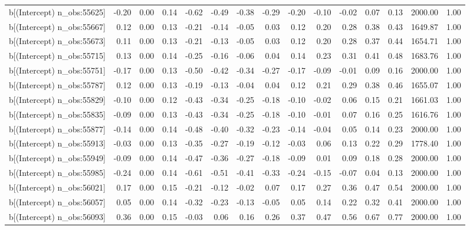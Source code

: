\begin{table}[ht]
\begin{tabular}{rrrrrrrrrrrrrrr}
  b[(Intercept) n\_obs:55625] & -0.20 & 0.00 & 0.14 & -0.62 & -0.49 & -0.38 & -0.29 & -0.20 & -0.10 & -0.02 & 0.07 & 0.13 & 2000.00 & 1.00 \\ 
  b[(Intercept) n\_obs:55667] & 0.12 & 0.00 & 0.13 & -0.21 & -0.14 & -0.05 & 0.03 & 0.12 & 0.20 & 0.28 & 0.38 & 0.43 & 1649.87 & 1.00 \\ 
  b[(Intercept) n\_obs:55673] & 0.11 & 0.00 & 0.13 & -0.21 & -0.13 & -0.05 & 0.03 & 0.12 & 0.20 & 0.28 & 0.37 & 0.44 & 1654.71 & 1.00 \\ 
  b[(Intercept) n\_obs:55715] & 0.13 & 0.00 & 0.14 & -0.25 & -0.16 & -0.06 & 0.04 & 0.14 & 0.23 & 0.31 & 0.41 & 0.48 & 1683.76 & 1.00 \\ 
  b[(Intercept) n\_obs:55751] & -0.17 & 0.00 & 0.13 & -0.50 & -0.42 & -0.34 & -0.27 & -0.17 & -0.09 & -0.01 & 0.09 & 0.16 & 2000.00 & 1.00 \\ 
  b[(Intercept) n\_obs:55787] & 0.12 & 0.00 & 0.13 & -0.19 & -0.13 & -0.04 & 0.04 & 0.12 & 0.21 & 0.29 & 0.38 & 0.46 & 1655.07 & 1.00 \\ 
  b[(Intercept) n\_obs:55829] & -0.10 & 0.00 & 0.12 & -0.43 & -0.34 & -0.25 & -0.18 & -0.10 & -0.02 & 0.06 & 0.15 & 0.21 & 1661.03 & 1.00 \\ 
  b[(Intercept) n\_obs:55835] & -0.09 & 0.00 & 0.13 & -0.43 & -0.34 & -0.25 & -0.18 & -0.10 & -0.01 & 0.07 & 0.16 & 0.25 & 1616.76 & 1.00 \\ 
  b[(Intercept) n\_obs:55877] & -0.14 & 0.00 & 0.14 & -0.48 & -0.40 & -0.32 & -0.23 & -0.14 & -0.04 & 0.05 & 0.14 & 0.23 & 2000.00 & 1.00 \\ 
  b[(Intercept) n\_obs:55913] & -0.03 & 0.00 & 0.13 & -0.35 & -0.27 & -0.19 & -0.12 & -0.03 & 0.06 & 0.13 & 0.22 & 0.29 & 1778.40 & 1.00 \\ 
  b[(Intercept) n\_obs:55949] & -0.09 & 0.00 & 0.14 & -0.47 & -0.36 & -0.27 & -0.18 & -0.09 & 0.01 & 0.09 & 0.18 & 0.28 & 2000.00 & 1.00 \\ 
  b[(Intercept) n\_obs:55985] & -0.24 & 0.00 & 0.14 & -0.61 & -0.51 & -0.41 & -0.33 & -0.24 & -0.15 & -0.07 & 0.04 & 0.13 & 2000.00 & 1.00 \\ 
  b[(Intercept) n\_obs:56021] & 0.17 & 0.00 & 0.15 & -0.21 & -0.12 & -0.02 & 0.07 & 0.17 & 0.27 & 0.36 & 0.47 & 0.54 & 2000.00 & 1.00 \\ 
  b[(Intercept) n\_obs:56057] & 0.05 & 0.00 & 0.14 & -0.32 & -0.23 & -0.13 & -0.05 & 0.05 & 0.14 & 0.22 & 0.32 & 0.41 & 2000.00 & 1.00 \\ 
  b[(Intercept) n\_obs:56093] & 0.36 & 0.00 & 0.15 & -0.03 & 0.06 & 0.16 & 0.26 & 0.37 & 0.47 & 0.56 & 0.67 & 0.77 & 2000.00 & 1.00 \\ 

\end{tabular}
\end{table}
